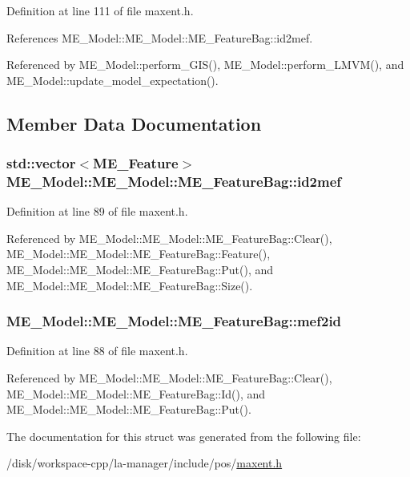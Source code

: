 Definition at line 111 of file maxent.h.

References ME\_\-Model::ME\_\-Model::ME\_\-FeatureBag::id2mef.

Referenced by ME\_\-Model::perform\_\-GIS(), ME\_\-Model::perform\_\-LMVM(), and ME\_\-Model::update\_\-model\_\-expectation().

\subsection{Member Data Documentation}
\hypertarget{structME__Model_1_1ME__FeatureBag_b2af8688c42c45aef0e15fdd5aa940a2}{
\subsubsection[{id2mef}]{\setlength{\rightskip}{0pt plus 5cm}std::vector$<${\bf ME\_\-Feature}$>$ ME\_\-Model::ME\_\-Model::ME\_\-FeatureBag::id2mef}}
\label{structME__Model_1_1ME__FeatureBag_b2af8688c42c45aef0e15fdd5aa940a2}




Definition at line 89 of file maxent.h.

Referenced by ME\_\-Model::ME\_\-Model::ME\_\-FeatureBag::Clear(), ME\_\-Model::ME\_\-Model::ME\_\-FeatureBag::Feature(), ME\_\-Model::ME\_\-Model::ME\_\-FeatureBag::Put(), and ME\_\-Model::ME\_\-Model::ME\_\-FeatureBag::Size().\hypertarget{structME__Model_1_1ME__FeatureBag_ae715d2d8e29e2bdec1413973bd677d7}{
\subsubsection[{mef2id}]{ ME\_\-Model::ME\_\-Model::ME\_\-FeatureBag::mef2id}}
\label{structME__Model_1_1ME__FeatureBag_ae715d2d8e29e2bdec1413973bd677d7}




Definition at line 88 of file maxent.h.

Referenced by ME\_\-Model::ME\_\-Model::ME\_\-FeatureBag::Clear(), ME\_\-Model::ME\_\-Model::ME\_\-FeatureBag::Id(), and ME\_\-Model::ME\_\-Model::ME\_\-FeatureBag::Put().

The documentation for this struct was generated from the following file:\begin{CompactItemize}
\item 
/disk/workspace-cpp/la-manager/include/pos/\hyperlink{maxent_8h}{maxent.h}\end{CompactItemize}
